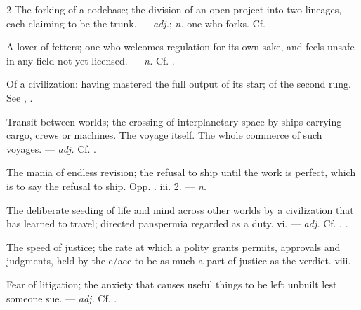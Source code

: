 \begin{multicols}{2}
 The forking of a codebase; the division of an open project into two lineages, each claiming to be the trunk.   —  \textit{adj.};  \textit{n.} one who forks. Cf. .

 A lover of fetters; one who welcomes regulation for its own sake, and feels unsafe in any field not yet licensed.  —  \textit{n.} Cf. .

 Of a civilization: having mastered the full output of its star; of the second rung. See , .

 Transit between worlds; the crossing of interplanetary space by ships carrying cargo, crews or machines.  The voyage itself.   The whole commerce of such voyages. —  \textit{adj.} Cf. .

 The mania of endless revision; the refusal to ship until the work is perfect, which is to say the refusal to ship. Opp. .   iii. 2. —  \textit{n.}

 The deliberate seeding of life and mind across other worlds by a civilization that has learned to travel; directed panspermia regarded as a duty.   vi. —  \textit{adj.} Cf. , .

 The speed of justice; the rate at which a polity grants permits, approvals and judgments, held by the e/acc to be as much a part of justice as the verdict.   viii.

 Fear of litigation; the anxiety that causes useful things to be left unbuilt lest someone sue. —  \textit{adj.} Cf. .


\end{multicols}
